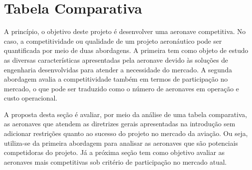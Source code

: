\chapter{Tabela Comparativa}
\label{tabelacomparativa}

A princípio, o objetivo deste projeto é desenvolver uma aeronave competitiva.
No caso, a competitividade ou qualidade de um projeto aeronáutico pode ser quantificada por meio de duas abordagens.
A primeira tem como objeto de estudo as diversas características apresentadas pela aeronave devido às soluções de engenharia desenvolvidas para atender a necessidade do mercado.
A segunda abordagem avalia a competitividade também em termos de participação no mercado, o que pode ser traduzido como o número de aeronaves em operação e custo operacional.

A proposta desta seção é avaliar, por meio da análise de uma tabela comparativa, as aeronaves que atendem as diretrizes gerais apresentadas na introdução sem adicionar restrições quanto ao sucesso do projeto no mercado da aviação.
Ou seja, utiliza-se da primeira abordagem para analisar as aeronaves que são potenciais competidoras do projeto.
Já a próxima seção tem como objetivo avaliar as aeronaves mais competitivas sob critério de participação no mercado atual.

